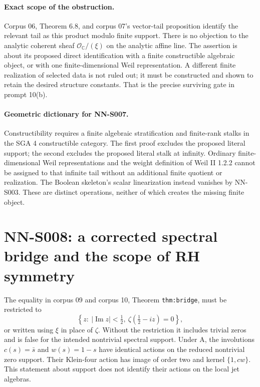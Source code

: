 \paragraph{Exact scope of the obstruction.}
Corpus 06, Theorem 6.8, and corpus 07's vector-tail proposition
identify the relevant tail as this product modulo finite support.
There is no objection to the analytic coherent sheaf
$\mathcal O_{\mathbb C}/(\xi)$ on the analytic affine line.
The assertion is about its proposed direct identification with a
finite constructible algebraic object, or with one finite-dimensional
Weil representation. A different finite realization of selected
data is not ruled out; it must be constructed and shown to retain
the desired structure constants. That is the precise surviving
gate in prompt 10(b).

\paragraph{Geometric dictionary for NN-S007.}
Constructibility requires a finite algebraic stratification and
finite-rank stalks in the SGA 4 constructible category. The first
proof excludes the proposed literal support; the second excludes
the proposed literal stalk at infinity. Ordinary finite-dimensional
Weil representations and the weight definition of Weil II 1.2.2
cannot be assigned to that infinite tail without an additional
finite quotient or realization. The Boolean skeleton's scalar
linearization instead vanishes by NN-S003. These are distinct
operations, neither of which creates the missing finite object.


\section{NN-S008: a corrected spectral bridge and the scope of RH symmetry}
\label{sec:NN-S008}

\begin{proposition}[NN-S008]
The equality in corpus 09 and corpus 10, Theorem
\texttt{thm:bridge}, must be restricted to
\[
 \left\{z:\ |\operatorname{Im}z|<\tfrac12,
               \ \zeta(\tfrac12-iz)=0\right\},
\]
or written using $\xi$ in place of $\zeta$. Without the restriction
it includes trivial zeros and is false for the intended nontrivial
spectral support. Under A, the involutions $c(s)=\bar s$ and
$w(s)=1-s$ have identical actions on the reduced nontrivial zero
support. Their Klein-four action has image of order two and kernel
$\{1,cw\}$. This statement about support does not identify their
actions on the local jet algebras.
\end{proposition}

